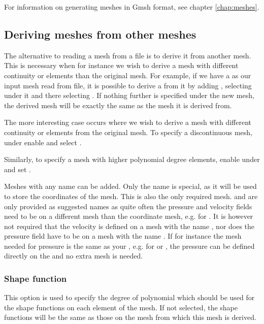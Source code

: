 For information on generating meshes in Gmsh format, see chapter
\ref{chap:meshes}.

\subsection{Deriving meshes from other meshes}
The alternative to reading a mesh from a file is to derive it from another
mesh. This is necessary when for instance we wish to derive a mesh with
different continuity or elements than the original mesh.
For example, if we have a  as our input mesh read
from file, it is possible to derive a  from it
by adding , selecting
 under it and there selecting
. If nothing further is specified
under the new mesh, the derived mesh will be exactly the same as the mesh
it is derived from.

The more interesting case occurs where we wish to derive a mesh with
different continuity or elements from the original mesh. To specify a
discontinuous mesh, under  enable
 and select .

Similarly, to specify a mesh with higher polynomial degree elements, enable
 under  and set
.

Meshes with any name can be added. Only the name 
is special, as it will be used to store the coordinates of the mesh. This
is also the only required mesh.  and 
are only provided as suggested names as quite often the pressure
and velocity fields need to be on a different mesh
than the coordinate mesh, e.g. for \PoDGPt. It is however
not required that the velocity is defined on a mesh with the name
, nor does the pressure field have to be on a mesh
with the name . If for instance the mesh needed
for pressure is the same as your , e.g.
for \Poo or \Pzero\Pone, the pressure can be defined directly on
the  and no extra mesh is needed.

\subsubsection{Shape function}

This option is used to specify the degree of polynomial which should be used
for the shape functions on each element of the mesh. If not selected, the
shape functions will be the same as those on the mesh from which this mesh
is derived.

